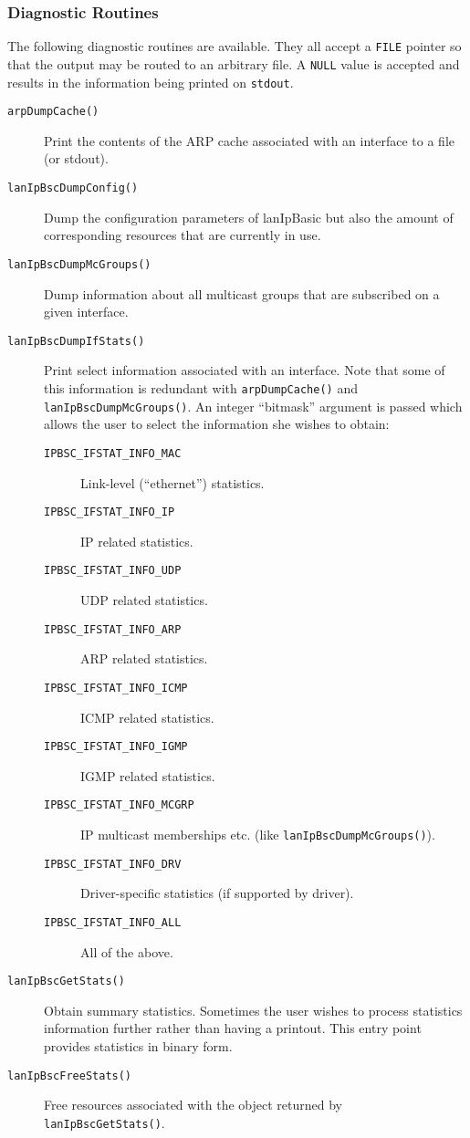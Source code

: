\documentclass{article}
\newcommand{\lip}{lanIpBasic}
\newcommand{\lipc}[1]{{\tt #1}}
\begin{document}
  \subsubsection{Diagnostic Routines}
  The following diagnostic routines are available. They all accept
  a \lipc{FILE} pointer so that the output may be routed to an
  arbitrary file. A \lipc{NULL} value is accepted and results
  in the information being printed on \lipc{stdout}.
  \begin{description}
  \item[\lipc{arpDumpCache()}] Print the contents of the ARP cache
    associated with an interface to a file (or stdout).
  \item[\lipc{lanIpBscDumpConfig()}] Dump the configuration parameters
    of \lip{} but also the amount of corresponding resources that are
    currently in use.
  \item[\lipc{lanIpBscDumpMcGroups()}] Dump information about all
    multicast groups that are subscribed on a given interface.
  \item[\lipc{lanIpBscDumpIfStats()}] Print select information
    associated with an interface. Note that some of this information
    is redundant with \lipc{arpDumpCache()} and \lipc{lanIpBscDumpMcGroups()}.
    An integer ``bitmask'' argument is passed which allows the
    user to select the information she wishes to obtain:
    \begin{description}
      \item[\lipc{IPBSC\_IFSTAT\_INFO\_MAC}]
        Link-level (``ethernet'') statistics.
      \item[\lipc{IPBSC\_IFSTAT\_INFO\_IP}]
        IP related statistics.
      \item[\lipc{IPBSC\_IFSTAT\_INFO\_UDP}]
        UDP related statistics.
      \item[\lipc{IPBSC\_IFSTAT\_INFO\_ARP}]
        ARP related statistics.
      \item[\lipc{IPBSC\_IFSTAT\_INFO\_ICMP}]
        ICMP related statistics.
      \item[\lipc{IPBSC\_IFSTAT\_INFO\_IGMP}]
        IGMP related statistics.
      \item[\lipc{IPBSC\_IFSTAT\_INFO\_MCGRP}]
        IP multicast memberships etc. (like \lipc{lanIpBscDumpMcGroups()}).
      \item[\lipc{IPBSC\_IFSTAT\_INFO\_DRV}]
        Driver-specific statistics (if supported by driver).
      \item[\lipc{IPBSC\_IFSTAT\_INFO\_ALL}]
        All of the above.
    \end{description}
  \item[\lipc{lanIpBscGetStats()}] Obtain summary statistics. Sometimes the user
    wishes to process statistics information further rather than having a printout.
    This entry point provides statistics in binary form.
  \item[\lipc{lanIpBscFreeStats()}] Free resources associated with the object
    returned by \lipc{lanIpBscGetStats()}.
  \end{description}
\end{document}
